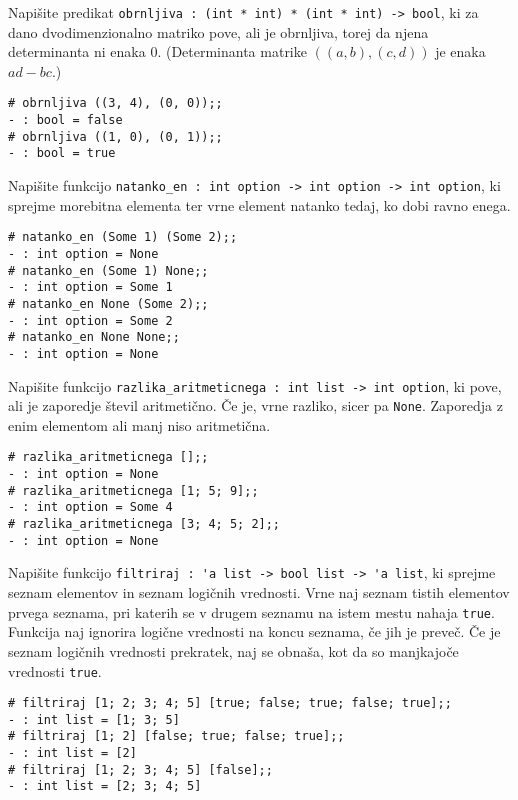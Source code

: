 \documentclass[arhiv]{../izpit}
\begin{document}


\naloga

\podnaloga
Napišite predikat \verb|obrnljiva : (int * int) * (int * int) -> bool|, ki za dano dvodimenzionalno matriko pove, ali je obrnljiva, torej da njena determinanta ni enaka 0. (Determinanta matrike $((a, b), (c, d))$ je enaka $ad - bc$.)

\begin{Verbatim}[fontsize=\small]
# obrnljiva ((3, 4), (0, 0));;
- : bool = false
# obrnljiva ((1, 0), (0, 1));;
- : bool = true
\end{Verbatim}

\podnaloga
Napišite funkcijo \verb|natanko_en : int option -> int option -> int option|, ki sprejme morebitna elementa ter vrne element natanko tedaj, ko dobi ravno enega.

\begin{Verbatim}[fontsize=\small]
# natanko_en (Some 1) (Some 2);;
- : int option = None
# natanko_en (Some 1) None;;
- : int option = Some 1
# natanko_en None (Some 2);;
- : int option = Some 2
# natanko_en None None;;
- : int option = None
\end{Verbatim}

\podnaloga
Napišite funkcijo \verb|razlika_aritmeticnega : int list -> int option|, ki pove, ali je zaporedje števil aritmetično. Če je, vrne razliko, sicer pa \verb|None|. Zaporedja z enim elementom ali manj niso aritmetična.

\begin{Verbatim}[fontsize=\small]
# razlika_aritmeticnega [];;
- : int option = None
# razlika_aritmeticnega [1; 5; 9];;
- : int option = Some 4
# razlika_aritmeticnega [3; 4; 5; 2];;
- : int option = None
\end{Verbatim}

\podnaloga
Napišite funkcijo \verb|filtriraj : 'a list -> bool list -> 'a list|, ki sprejme seznam elementov in seznam logičnih vrednosti. Vrne naj seznam tistih elementov prvega seznama, pri katerih se v drugem seznamu na istem mestu nahaja \verb|true|. Funkcija naj ignorira logične vrednosti na koncu seznama, če jih je preveč. Če je seznam logičnih vrednosti prekratek, naj se obnaša, kot da so manjkajoče vrednosti \verb|true|.

\begin{Verbatim}[fontsize=\small]
# filtriraj [1; 2; 3; 4; 5] [true; false; true; false; true];;
- : int list = [1; 3; 5]
# filtriraj [1; 2] [false; true; false; true];;
- : int list = [2]
# filtriraj [1; 2; 3; 4; 5] [false];;
- : int list = [2; 3; 4; 5]
\end{Verbatim}
\end{document}
